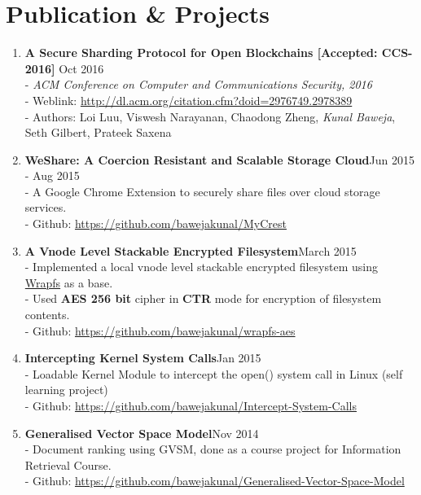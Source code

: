 \documentclass{article}
\begin{document}
\section*{Publication \& Projects}

\begin{enumerate}

    \item \textbf{A Secure Sharding Protocol for Open Blockchains [Accepted: CCS-2016]} {\hfill Oct 2016}\\
    - \textit{ACM Conference on Computer and Communications Security, 2016}\\
    - Weblink: \href{http://dl.acm.org/citation.cfm?doid=2976749.2978389}{http://dl.acm.org/citation.cfm?doid=2976749.2978389}\\
    - Authors: Loi Luu, Viswesh Narayanan, Chaodong Zheng, \textit{Kunal Baweja}, Seth Gilbert, Prateek Saxena

    \item \textbf{WeShare: A Coercion Resistant and Scalable Storage Cloud}{\hfill Jun 2015 - Aug 2015}\\
    - A Google Chrome Extension to securely share files over cloud storage services.\\
    - Github: \href{https://github.com/bawejakunal/MyCrest}{https://github.com/bawejakunal/MyCrest}
    
    \item \textbf{A Vnode Level Stackable Encrypted Filesystem}{\hfill March 2015}\\
    - Implemented a local vnode level stackable encrypted filesystem using \href{http://wrapfs.filesystems.org/}{Wrapfs} as a base.\\
    - Used \textbf{AES 256 bit} cipher in \textbf{CTR} mode for encryption of filesystem contents.\\
    - Github: \href{https://github.com/bawejakunal/wrapfs-aes}{https://github.com/bawejakunal/wrapfs-aes}
    
    \item \textbf{Intercepting Kernel System Calls}{\hfill Jan 2015}\\
    - Loadable Kernel Module to intercept the open() system call in Linux (self learning project)\\
    - Github: \href{https://github.com/bawejakunal/Intercept-System-Calls}{https://github.com/bawejakunal/Intercept-System-Calls}

    \item \textbf{Generalised Vector Space Model}{\hfill Nov 2014}\\
    - Document ranking using GVSM, done as a course project for Information Retrieval Course.\\
    - Github: \href{https://github.com/bawejakunal/Generalised-Vector-Space-Model}{https://github.com/bawejakunal/Generalised-Vector-Space-Model}
    

\end{enumerate}
\end{document}
